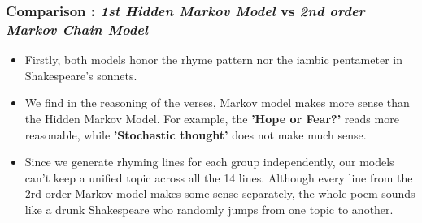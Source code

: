 \subsubsection{Comparison : \textit{1st Hidden Markov Model} vs \textit{2nd order Markov Chain Model}}
\begin{itemize}
	\item Firstly, both models honor the rhyme pattern nor the iambic pentameter in Shakespeare's sonnets. 
	\item We find in the reasoning of the verses, Markov model makes more sense than the Hidden Markov Model. For example, the \textbf{'Hope or Fear?'} reads more reasonable, while \textbf{'Stochastic thought'} does not make much sense. 
	\item Since we generate rhyming lines for each group independently, our models can't keep a unified topic across all the 14 lines. Although every line from the 2rd-order Markov model makes some sense separately, the whole poem sounds like a drunk Shakespeare who randomly jumps from one topic to another.
\end{itemize}